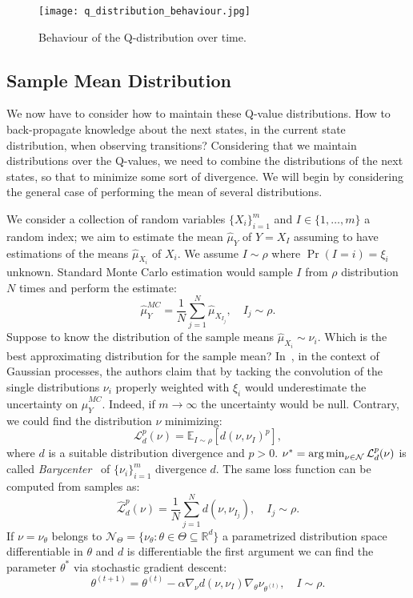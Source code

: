 \begin{figure}
 \texttt{[image: q\_distribution\_behaviour.jpg]}
 \caption{Behaviour of the Q-distribution over time.}
 \label{fig:q_distribution_behaviour}
\end{figure}
\subsection{Sample Mean Distribution}
We now have to consider how to maintain these Q-value distributions. How to back-propagate knowledge about the next states, in the current state distribution, when observing transitions? Considering that we maintain distributions over the Q-values, we need to combine the distributions of the next states, so that to minimize some sort of divergence. We will begin by considering the general case of performing the mean of several distributions.\par
We consider a collection of random variables $\{X_i\}_{i=1}^m$ and $I \in \{1,\dots,m\}$ a random index; we aim to estimate the mean $\widehat{\mu}_Y$ of $Y = X_{I}$ assuming to have estimations of the means $\widehat{\mu}_{X_i}$ of $X_i$. We assume $I \sim \rho$ where $\Pr(I = i) = \xi_i$ unknown. Standard Monte Carlo estimation would sample $I$ from $\rho$ distribution $N$ times and perform the estimate:
\begin{equation}
	\widehat{\mu}_{Y}^{MC} = \frac{1}{N} \sum_{j=1}^N \widehat{\mu}_{X_{I_j}}, \quad I_j \sim \rho.
\end{equation}
Suppose to know the distribution of the sample means $\widehat{\mu}_{X_i} \sim \nu_i$. Which is the best approximating distribution for the sample mean? In~\cite{NIPS2017_7149}, in the context of Gaussian processes, the authors claim that by tacking the convolution of the single distributions $\nu_i$ properly weighted with $\xi_i$ would underestimate the uncertainty on $\widehat{\mu}_{Y}^{MC}$. Indeed, if $m\rightarrow \infty$ the uncertainty would be null. Contrary, we could find the distribution $\nu$ minimizing:
\begin{equation}
	\mathcal{L}_d^p (\nu) = \mathbb{E}_{I \sim \rho} \left[ d(\nu, \nu_I)^p \right],
\end{equation}
where $d$ is a suitable distribution divergence and $p>0$. $\nu^* = \operatorname*{arg\,min}_{\nu \in \mathcal{N}} \mathcal{L}_d^p (\nu)$ is called \emph{Barycenter}~\cite{journals/siamma/AguehC11} of $\{\nu_i\}_{i=1}^m$ \wrt divergence $d$. The same loss function can be computed from samples as:
\begin{equation}
	\widehat{\mathcal{L}}_d^p (\nu)  = \frac{1}{N} \sum_{j=1}^N d(\nu, {\nu_{I_j}}), \quad I_j \sim \rho.
\end{equation}
If $\nu = \nu_{\theta}$ belongs to $\mathcal{N}_{\Theta} = \{ \nu_{\theta}: \theta \in \Theta \subseteq \mathbb{R}^d \}$ a parametrized distribution space differentiable in $\theta$ and $d$ is differentiable \wrt the first argument we can find the parameter $\theta^*$ via stochastic gradient descent:
\begin{equation}
	\theta^{(t+1)} = \theta^{(t)} - \alpha \nabla_\nu d(\nu, {\nu_{I}}) \nabla_{\theta} \nu_{\theta^{(t)}}, \quad I \sim \rho.
\end{equation}

